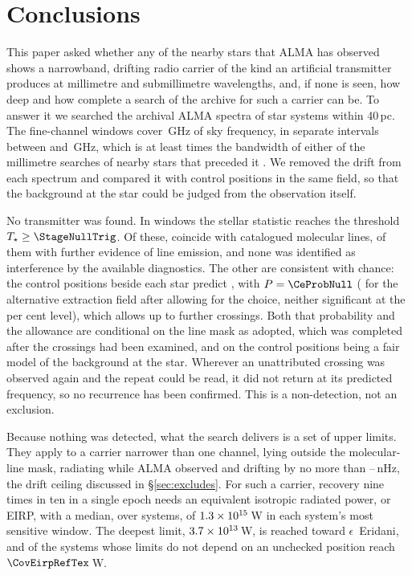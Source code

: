 \section{Conclusions}
\label{sec:conclusions}

This paper asked whether any of the nearby stars that ALMA has observed shows
a narrowband, drifting radio carrier of the kind an artificial transmitter
produces at millimetre and submillimetre wavelengths, and, if none is
seen, how deep and how complete a search of the archive for such a carrier
can be. To answer it we searched the archival ALMA spectra of
\NSysClassA{} star systems within 40\,pc. The fine-channel windows cover
\CvUnionA\,GHz of sky frequency, in \CovNIslands{} separate intervals between
\SurvFreqLoA{} and \SurvFreqHiA\,GHz, which is at least \SbPriorRatio{} times
the bandwidth of either of the millimetre searches of nearby stars that
preceded it \citep{Steffes1994,Mauersberger1996}. We removed the drift from
each spectrum and compared it with control positions in the same field, so
that the background at the star could be judged from the observation itself.

No transmitter was found. In \CsNCross{} windows the stellar statistic reaches
the threshold $T_\star\geq\StageNullTrig$. Of these, \MkNCoinc{} coincide with
catalogued molecular lines, \LnAttrSupp{} of them with further evidence of
line emission, and none was identified as interference by the available
diagnostics. The other \CeObs{} are consistent with chance: the
control positions beside each star predict \CeExp, with $P=\CeProbNull$
(\FrTwoTrialP{} for the alternative extraction field after allowing for the
choice, neither significant at the \CeAlphaPct{} per cent level), which
allows up to \CeAddLim{} further crossings. Both that probability and the
allowance are conditional on the line mask as adopted, which was completed
after the crossings had been examined, and on the control positions being a
fair model of the background at the star. Wherever an unattributed crossing
was observed again and the repeat could be read, it did not return at its
predicted frequency, so no recurrence has been confirmed. This is a
non-detection, not an exclusion.

Because nothing was detected, what the search delivers is a set of upper
limits. They apply to a carrier narrower than one channel, lying outside the
molecular-line mask, radiating while ALMA observed and drifting by no more
than \DriftCeilLo--\DriftCeilHi\,nHz, the drift ceiling discussed in
\S\ref{sec:excludes}. For such a carrier, recovery nine times in ten in a single epoch needs an equivalent
isotropic radiated power, or EIRP, with a median, over systems, of
$1.3\times10^{15}$\,W in each system's most sensitive window. The deepest
limit, $3.7\times10^{13}$\,W, is reached toward $\epsilon$~Eridani, and
\NSysEfifteen{} of the \NSysALimSum{} systems whose limits do not depend on an
unchecked position reach $\CovEirpRefTex$\,W.

